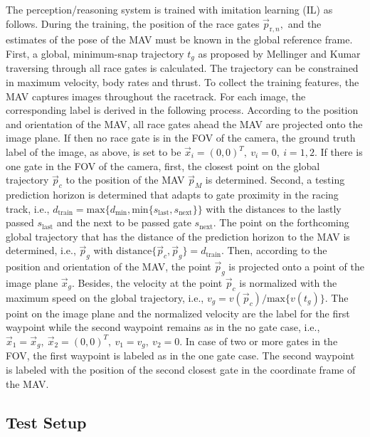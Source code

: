 The perception/reasoning system is trained with imitation learning (IL) as follows.
During the training, the position of the race gates $\vec p_{\text{r},n},$ and
the estimates of the pose of the MAV must be known in the global reference frame.
First, a global, minimum-snap trajectory $t_g$ as proposed by Mellinger and Kumar \cite{Mellinger2011}
traversing through all race gates is calculated.
The trajectory can be constrained in maximum velocity, body rates and thrust.
To collect the training features, the MAV captures images throughout the racetrack.
For each image, the corresponding label is derived in the following process.
According to the position and orientation of the MAV, 
all race gates ahead the MAV are projected onto the image plane.
If then no race gate is in the FOV of the camera,
the ground truth label of the image, as above, is set to be $\vec x_i = (0,0)^T,\ v_i =0,\ i=1,2 $.
If there is one gate in the FOV of the camera,
first, the closest point on the global trajectory $\vec p_c$ to the position of the MAV $\vec p_M$ is determined.
Second, a testing prediction horizon is determined that adapts to gate proximity in the racing track,
i.e., $d_\text{train} = \text{max} \{ d_\text{min}, \text{min} \{ s_\text{last} , s_\text{next} \}\} $
with the distances to the lastly passed $s_\text{last}$ and the next to be passed gate $s_\text{next}$.
The point on the forthcoming global trajectory that has the distance of the prediction horizon to the MAV is determined,
i.e., $\vec p_g$ with $\text{distance} \{ \vec p_c, \vec p_g \} = d_\text{train}$.
Then, according to the position and orientation of the MAV, the point $\vec p_g$ is projected onto a point of the image plane $\vec x_g$.
Besides, the velocity at the point $\vec p_c$ is normalized with the maximum speed on the global trajectory, 
i.e., $v_g = v(\vec p_c) / \text{max} \{v(t_g) \}$.
The point on the image plane and the normalized velocity are the label for the first waypoint
while the second waypoint remains as in the no gate case, 
i.e., $\vec x_1 = \vec x_g,\ \vec x_2 = (0,0)^T,\ v_1 = v_g,\ v_2 = 0 $.
In case of two or more gates in the FOV,
the first waypoint is labeled as in the one gate case.
The second waypoint is labeled with the position of the second closest gate in the coordinate frame of the MAV.



\subsection{Test Setup} 

